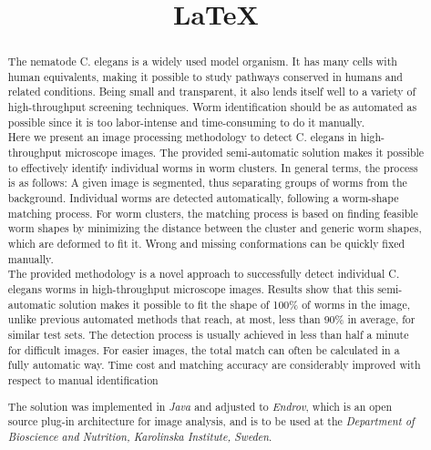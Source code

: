 \documentclass[12pt]{article}
\title{\LaTeX}
\date{}
\begin{document}
  \maketitle 
  \begin{abstract}



The nematode C. elegans is a widely used model organism. It has many cells with
human equivalents, making it possible to study pathways conserved in humans
and related conditions. Being small and transparent, it also lends itself well to
a variety of high-throughput screening techniques.
Worm identification should be as automated
as possible since it is too labor-intense and time-consuming to do it manually.\\

Here we present an image processing methodology to detect 
C. elegans in high-throughput microscope images. 
The provided semi-automatic solution makes it possible to effectively identify individual 
worms in worm clusters. In general terms, the process is as follows: 
A given image is segmented, thus 
separating groups of worms from the background. Individual worms are detected
automatically, following a worm-shape matching process. For worm clusters, the 
matching process
is based on finding feasible worm shapes by minimizing the distance between
the cluster and generic worm shapes, which are deformed to fit it.
Wrong and missing conformations can be quickly fixed manually. \\

The provided methodology is a novel approach 
to successfully detect individual C. elegans worms in high-throughput microscope images.
Results show that this semi-automatic solution makes it possible to fit the shape of
100\% of worms in the image, unlike previous automated methods that reach, 
at most, less than 90\% in average, for similar test sets.
The detection process is usually achieved in less than half a minute for difficult images. 
For easier images, the total match can often be calculated in a fully automatic way.
Time cost and matching accuracy are considerably improved 
with respect to manual identification

The solution was implemented in \emph{Java} and adjusted to \emph{Endrov}, which is an open source plug-in architecture for image analysis, and is to be used at the
\emph{Department of Bioscience and Nutrition, Karolinska Institute, Sweden}. 
  \end{abstract}
\end{document}
